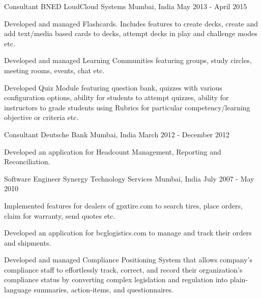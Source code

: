\begin{cventries}
  \cventry
    {Consultant} %
    {BNED LoudCloud Systems} %
    {Mumbai, India} %
    {May 2013 - April 2015} %
    {
      \begin{cvitems} %
        \item {Developed and managed Flashcards. Includes features to create decks, create and add text/media based cards to decks, attempt decks in play and challenge modes etc.}
        \item {Developed and managed Learning Communities featuring groups, study circles, meeting rooms, events, chat etc.}
        \item {Developed Quiz Module featuring question bank, quizzes with various configuration options, ability for students to attempt quizzes, ability for instructors to grade students using Rubrics for particular competency/learning objective or criteria etc.}
      \end{cvitems}
    }

  \cventry
    {Consultant} %
    {Deutsche Bank} %
    {Mumbai, India} %
    {March 2012 - December 2012} %
    {
      \begin{cvitems} %
        \item {Developed an application for Headcount Management, Reporting and Reconciliation.}
      \end{cvitems}
    }

  \cventry
    {Software Engineer} %
    {Synergy Technology Services} %
    {Mumbai, India} %
    {July 2007 - May 2010} %
    {
      \begin{cvitems} %
        \item {Implemented features for dealers of gpxtire.com to search tires, place orders, claim for warranty, send quotes etc.}
        \item {Developed an application for bcglogistics.com to manage and track their orders and shipments.}
        \item {Developed and managed Compliance Positioning System that allows company’s compliance staff to effortlessly track, correct, and record their organization’s compliance status by converting complex legislation and regulation into plain-language summaries, action-items, and questionnaires.}
      \end{cvitems}
    }


\end{cventries}
